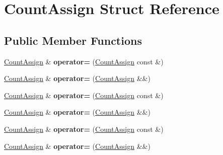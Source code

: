 \hypertarget{struct_count_assign}{}\section{Count\+Assign Struct Reference}
\label{struct_count_assign}
\subsection*{Public Member Functions}
\begin{DoxyCompactItemize}
\item 
\mbox{\label{struct_count_assign_ab38599169b71546e74b3e34e13fc7969}} 
\mbox{\hyperlink{struct_count_assign}{Count\+Assign}} \& {\bfseries operator=} (\mbox{\hyperlink{struct_count_assign}{Count\+Assign}} const \&)
\item 
\mbox{\label{struct_count_assign_ac3665b2871abba8e5b64140c63f9d70c}} 
\mbox{\hyperlink{struct_count_assign}{Count\+Assign}} \& {\bfseries operator=} (\mbox{\hyperlink{struct_count_assign}{Count\+Assign}} \&\&)
\item 
\mbox{\label{struct_count_assign_ab38599169b71546e74b3e34e13fc7969}} 
\mbox{\hyperlink{struct_count_assign}{Count\+Assign}} \& {\bfseries operator=} (\mbox{\hyperlink{struct_count_assign}{Count\+Assign}} const \&)
\item 
\mbox{\label{struct_count_assign_ac3665b2871abba8e5b64140c63f9d70c}} 
\mbox{\hyperlink{struct_count_assign}{Count\+Assign}} \& {\bfseries operator=} (\mbox{\hyperlink{struct_count_assign}{Count\+Assign}} \&\&)
\item 
\mbox{\label{struct_count_assign_ab38599169b71546e74b3e34e13fc7969}} 
\mbox{\hyperlink{struct_count_assign}{Count\+Assign}} \& {\bfseries operator=} (\mbox{\hyperlink{struct_count_assign}{Count\+Assign}} const \&)
\item 
\mbox{\label{struct_count_assign_ac3665b2871abba8e5b64140c63f9d70c}} 
\mbox{\hyperlink{struct_count_assign}{Count\+Assign}} \& {\bfseries operator=} (\mbox{\hyperlink{struct_count_assign}{Count\+Assign}} \&\&)
\end{DoxyCompactItemize}
